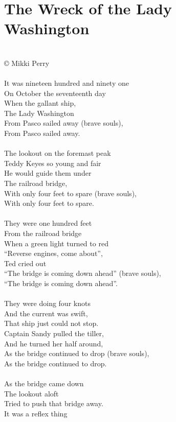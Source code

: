 \documentclass[letterpaper,9pt]{article}
\begin{document}
\section{The Wreck of the Lady Washington}
\noindent
\\© Mikki Perry
\\
\\It was nineteen hundred and ninety one
\\On October the seventeenth day
\\When the gallant ship,
\\The Lady Washington
\\From Pasco sailed away (brave souls),
\\From Pasco sailed away.
\\
\\The lookout on the foremast peak
\\Teddy Keyes so young and fair
\\He would guide them under
\\The railroad bridge,
\\With only four feet to spare (brave souls),
\\With only four feet to spare.
\\
\\They were one hundred feet
\\From the railroad bridge
\\When a green light turned to red
\\“Reverse engines, come about”,
\\Ted cried out
\\“The bridge is coming down ahead” (brave souls),
\\“The bridge is coming down ahead”.
\\
\\They were doing four knots
\\And the current was swift,
\\That ship just could not stop.
\\Captain Sandy pulled the tiller,
\\And he turned her half around,
\\As the bridge continued to drop (brave souls),
\\As the bridge continued to drop.
\\
\\As the bridge came down
\\The lookout aloft
\\Tried to push that bridge away.
\\It was a reflex thing
\end{document}

